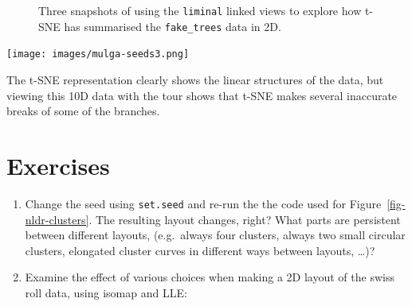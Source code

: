 \documentclass[
  letterpaper,
]{krantz}
\newcommand{\insightbox}[1]{%
\noindent\colorbox{insight!30}{%
\begin{minipage}{0.98\textwidth}%
    \centering%
    \begin{minipage}[c]{0.15\textwidth} %
      \texttt{[image: images/mulga-seeds3.png]} %
    \end{minipage}%
    \hfill %
    \begin{minipage}[c]{0.8\textwidth} %
      \bigskip%
      \textsf{#1}%
      \bigskip%
    \end{minipage}%
    \hspace*{3mm}%
  \end{minipage}%
}%
}
\begin{document}
\begin{figure}
\begin{minipage}{\linewidth}


\end{minipage}%

\caption{\label{fig-liminal-trees}Three snapshots of using the
\texttt{liminal} linked views to explore how t-SNE has summarised the
\texttt{fake\_trees} data in 2D.}

\end{figure}%

\insightbox{The t-SNE representation clearly shows the linear structures of the data, but viewing this 10D data with the tour shows that t-SNE makes several inaccurate breaks of some of the branches. }

  
 

\section*{Exercises}\label{exercises-4}


\begin{enumerate}
\def\labelenumi{\arabic{enumi}.}
\item
  Change the seed using \texttt{set.seed} and re-run the the code used
  for Figure~\ref{fig-nldr-clusters}. The resulting layout changes,
  right? What parts are persistent between different layouts,
  (e.g.~always four clusters, always two small circular clusters,
  elongated cluster curves in different ways between layouts, \ldots)?
\item
  Examine the effect of various choices when making a 2D layout of the
  swiss roll data, using isomap and LLE:
\end{enumerate}
\end{document}
